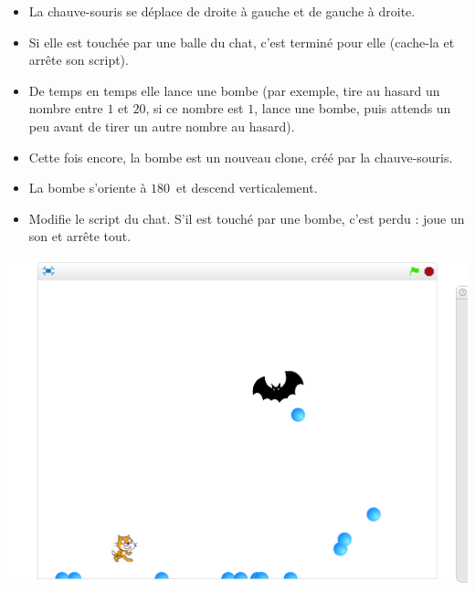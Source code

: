 \documentclass[class=report,crop=false, 12pt]{standalone}
\begin{document}
\begin{activite}

\sauteligne

\begin{itemize}
  \item La chauve-souris se déplace de droite à gauche et de gauche à droite.
  \item Si elle est touchée par une balle du chat, c'est terminé pour elle (cache-la et arrête son script).
  \item De temps en temps elle lance une bombe (par exemple, tire au hasard un nombre entre $1$ et $20$, si ce nombre est $1$, lance une bombe, puis attends un peu avant de tirer un autre nombre au hasard).
  \item Cette fois encore, la bombe est un nouveau clone, créé par la chauve-souris.
  \item La bombe s'oriente à $180$\textdegree\ et descend verticalement.
  \item Modifie le script du chat. S'il est touché par une bombe, c'est perdu : joue un son et arrête tout.
\end{itemize}

\begin{center}
  \includegraphics[scale=\scaleecran]{ecran-10-ex2} 
\end{center}

  
\end{activite}
\end{document}
